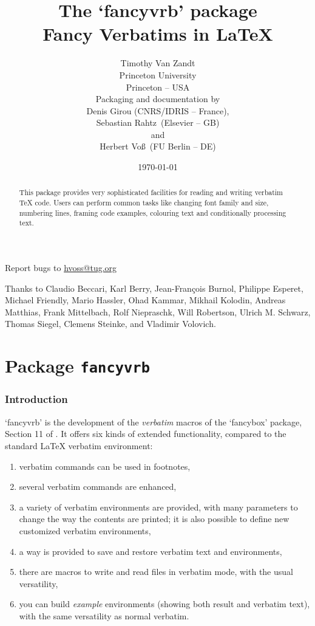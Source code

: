 \documentclass[twoside]{article}
\title{The `\textsf{fancyvrb}' package\\Fancy Verbatims in \LaTeX}
\author{Timothy Van Zandt\\Princeton University\\Princeton -- USA\\[5mm]
        {Packaging and documentation by}\\
        {\footnotesize Denis Girou (CNRS/IDRIS -- France),}\\[-2mm]
        {\footnotesize Sebastian Rahtz\dagger\ (Elsevier -- GB)}\\[-2mm]
        {\footnotesize and}\\[-2mm]
        {\footnotesize Herbert Voß\ (FU Berlin -- DE)}
        }
\date{\today}
\newcommand\FBoxPackage{`\textsf{fancybox}'}
\newcommand\FVrbPackage{`\textsf{fancyvrb}'}
\begin{document}
\maketitle
%
\begin{abstract}
    This package provides very sophisticated facilities for reading and
  writing verbatim \TeX{} code. Users can perform common tasks like changing
  font family and size, numbering lines, framing code examples, colouring
  text and conditionally processing text.
\end{abstract}

\begin{center}
Report bugs to \url{hvoss@tug.org}
\end{center}

\vfill
Thanks to 
Claudio Beccari,
Karl Berry,
Jean-François Burnol, 
Philippe Esperet, %
Michael Friendly, %
Mario Hassler, %
Ohad Kammar, %
Mikhail Kolodin, %
Andreas Matthias,
Frank Mittelbach,
Rolf Niepraschk, %
Will Robertson,
Ulrich M. Schwarz, 
Thomas Siegel, %
Clemens Steinke,
and 
Vladimir Volovich. %
\clearpage
\tableofcontents
\clearpage


\part{Package \texttt{fancyvrb}}


\section{Introduction}
%
  \FVrbPackage{} is the development of the \emph{verbatim} macros of the
\FBoxPackage{} package,  Section 11 of \cite{FancyBox}. It offers six kinds
of extended functionality, compared to the standard \LaTeX{}
\textsf{verbatim} environment:

\begin{enumerate}
  \item verbatim commands can be used in footnotes,
  \item several verbatim commands are enhanced,
  \item a variety of verbatim environments are provided, with many
  parameters to change the way the contents are printed; it is also possible
  to define new customized verbatim environments,
  \item a way is provided to save and restore verbatim text and environments,
  \item there are macros to write and read files in verbatim mode, with the
  usual versatility,
  \item you can build \emph{example} environments (showing both result and
  verbatim text), with the same versatility as normal verbatim.
\end{enumerate}
\end{document}
